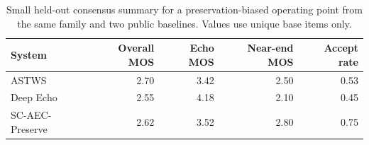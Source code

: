 \begin{table}[t]
\caption{Small held-out consensus summary for a preservation-biased operating point from the same family and two public baselines. Values use unique base items only.}
\label{tab:farend-protect-heldout}
\centering
\small
\begin{tabular}{lrrrr}
\hline
System & Overall MOS & Echo MOS & Near-end MOS & Accept rate \\
\hline
ASTWS & 2.70 & 3.42 & 2.50 & 0.53 \\
Deep Echo & 2.55 & 4.18 & 2.10 & 0.45 \\
SC-AEC-Preserve & 2.62 & 3.52 & 2.80 & 0.75 \\
\hline
\end{tabular}
\end{table}
